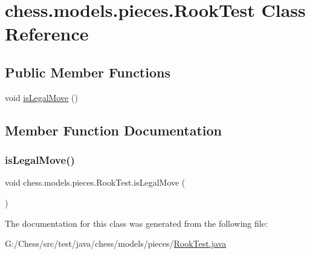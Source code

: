 \hypertarget{classchess_1_1models_1_1pieces_1_1_rook_test}{}\section{chess.\+models.\+pieces.\+Rook\+Test Class Reference}
\label{classchess_1_1models_1_1pieces_1_1_rook_test}
\subsection*{Public Member Functions}
\begin{DoxyCompactItemize}
\item 
void \mbox{\hyperlink{classchess_1_1models_1_1pieces_1_1_rook_test_a3c56b66f7159677ac04305b4029c58ca}{is\+Legal\+Move}} ()
\end{DoxyCompactItemize}


\subsection{Member Function Documentation}
\mbox{\label{classchess_1_1models_1_1pieces_1_1_rook_test_a3c56b66f7159677ac04305b4029c58ca}} 
\subsubsection{\texorpdfstring{is\+Legal\+Move()}{isLegalMove()}}
{\footnotesize\ttfamily void chess.\+models.\+pieces.\+Rook\+Test.\+is\+Legal\+Move (\begin{DoxyParamCaption}{ }\end{DoxyParamCaption})}



The documentation for this class was generated from the following file\+:\begin{DoxyCompactItemize}
\item 
G\+:/\+Chess/src/test/java/chess/models/pieces/\mbox{\hyperlink{_rook_test_8java}{Rook\+Test.\+java}}\end{DoxyCompactItemize}
